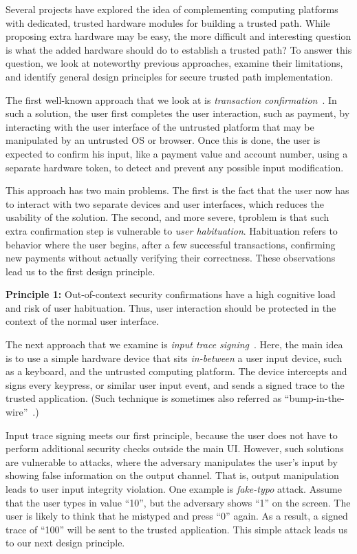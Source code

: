 Several projects have explored the idea of complementing computing platforms with dedicated, trusted hardware modules for building a trusted path. While proposing extra hardware may be easy, the more difficult and interesting question is what the added hardware should do to establish a trusted path? To answer this question, we look at noteworthy previous approaches, examine their limitations, and identify general design principles for secure trusted path implementation.
    
The first well-known approach that we look at is \emph{transaction confirmation}~\cite{filyanov2011uni}. In such a solution, the user first completes the user interaction, such as payment, by interacting with the user interface of the untrusted platform that may be manipulated by an untrusted OS or browser. Once this is done, the user is expected to confirm his input, like a payment value and account number, using a separate hardware token, to detect and prevent any possible input modification.

This approach has two main problems. The first is the fact that the user now has to interact with two separate devices and user interfaces, which reduces the usability of the solution. The second, and more severe, tproblem is that such extra confirmation step is vulnerable to \emph{user habituation}. Habituation refers to behavior where the user begins, after a few successful transactions, confirming new payments without actually verifying their correctness. These observations lead us to the first design principle.  

\begin{tcolorbox}
\textbf{Principle 1:} Out-of-context security confirmations have a high cognitive load and risk of user habituation. Thus, user interaction should be protected in the context of the normal user interface.
\end{tcolorbox}

The next approach that we examine is \emph{input trace signing}~\cite{IntegriKey}. Here, the main idea is to use a simple hardware device that sits \emph{in-between} a user input device, such as a keyboard, and the untrusted computing platform. The device intercepts and signs every keypress, or similar user input event, and sends a signed trace to the trusted application. (Such technique is sometimes also referred as ``bump-in-the-wire''~\cite{McCPerRei2006}.) 

Input trace signing meets our first principle, because the user does not have to perform additional security checks outside the main UI. However, such solutions are vulnerable to attacks, where the adversary manipulates the user's input by showing false information on the output channel. That is, output manipulation leads to user input integrity violation. One example is \emph{fake-typo} attack. Assume that the user types in value ``10'', but the adversary shows ``1'' on the screen. The user is likely to think that he mistyped and press ``0'' again. As a result, a signed trace of ``100'' will be sent to the trusted application. This simple attack leads us to our next design principle.

